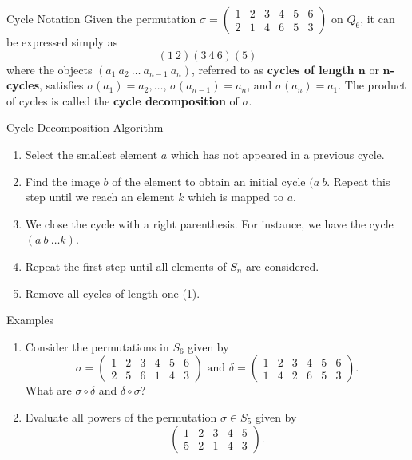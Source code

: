 \documentclass{beamer}
\begin{document}
\begin{frame}{Cycle Notation}
\justifying
Given the permutation $\sigma = \begin{pmatrix} 1 & 2 & 3 & 4 & 5 & 6 \\ 2 & 1 & 4 & 6 & 5 & 3 \end{pmatrix}$ on $Q_6$, it can be expressed simply as
\[
(1 \ 2)(3 \ 4 \ 6)(5)
\]
where the objects $(a_1 \ a_2 \ \dots \ a_{n - 1} \ a_n)$, referred to as \textbf{cycles of length $\boldsymbol{n}$} or \textbf{$\boldsymbol{n}$-cycles}, satisfies $\sigma(a_1) = a_2, \dots$, $\sigma\left(a_{n - 1}\right) = a_n$, and $\sigma(a_n) = a_1$. The product of cycles is called the \textbf{cycle decomposition} of $\sigma$.
\end{frame}

\begin{frame}{Cycle Decomposition Algorithm}
    \justifying
    \begin{enumerate}
        \justifying
        \item Select the smallest element $a$ which has not appeared in a previous cycle.
        \item Find the image $b$ of the element to obtain an initial cycle $(a \ b$. Repeat this step until we reach an element $k$ which is mapped to $a$. 
        \item We close the cycle with a right parenthesis. For instance, we have the cycle $(a \ b \ \dots k)$.
        \item Repeat the first step until all elements of $S_n$ are considered.
        \item Remove all cycles of length one (1).
    \end{enumerate}
\end{frame}

\begin{frame}{Examples}
\begin{enumerate}
\justifying
\item Consider the permutations in $S_6$ given by
\[
\sigma = \begin{pmatrix}
1 & 2 & 3 & 4 & 5 & 6 \\
2 & 5 & 6 & 1 & 4 & 3
\end{pmatrix} \text{ and }
\delta = \begin{pmatrix}
1 & 2 & 3 & 4 & 5 & 6 \\
1 & 4 & 2 & 6 & 5 & 3
\end{pmatrix}.
\]
What are $\sigma \circ \delta$ and $\delta \circ \sigma$?
\item Evaluate all powers of the permutation $\sigma \in S_5$ given by
\[
\begin{pmatrix} 1 & 2 & 3 & 4 & 5 \\ 5 & 2 & 1 & 4 & 3 \end{pmatrix}.
\]
\end{enumerate}    
\end{frame}
\end{document}
